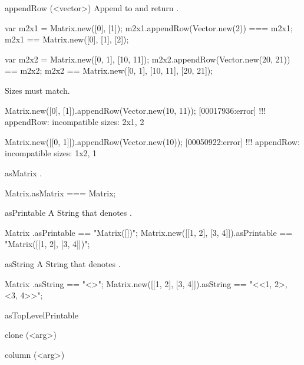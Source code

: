\begin{urbiscriptapi}
\item[appendRow](<vector>)%
  Append  to \this and return \this.
\begin{urbiassert}
var m2x1 = Matrix.new([0], [1]);
m2x1.appendRow(Vector.new(2)) === m2x1;
m2x1 == Matrix.new([0], [1], [2]);

var m2x2 = Matrix.new([0, 1], [10, 11]);
m2x2.appendRow(Vector.new(20, 21)) == m2x2;
m2x2 == Matrix.new([0, 1], [10, 11], [20, 21]);
\end{urbiassert}

  Sizes must match.
\begin{urbiscript}
Matrix.new([0], [1]).appendRow(Vector.new(10, 11));
[00017936:error] !!! appendRow: incompatible sizes: 2x1, 2

Matrix.new([[0, 1]]).appendRow(Vector.new(10));
[00050922:error] !!! appendRow: incompatible sizes: 1x2, 1
\end{urbiscript}


\item[asMatrix]%
  \this.
\begin{urbiassert}
Matrix.asMatrix === Matrix;
\end{urbiassert}

\item[asPrintable]%
  A String that denotes \this.
\begin{urbiassert}
Matrix                      .asPrintable == "Matrix([])";
Matrix.new([[1, 2], [3, 4]]).asPrintable == "Matrix([[1, 2], [3, 4]])";
\end{urbiassert}

\item[asString]%
  A String that denotes \this.
\begin{urbiassert}
Matrix                      .asString == "<>";
Matrix.new([[1, 2], [3, 4]]).asString == "<<1, 2>, <3, 4>>";
\end{urbiassert}

\item[asTopLevelPrintable]%
\begin{urbiassert}

\end{urbiassert}

\item[clone](<arg>)%
\begin{urbiassert}

\end{urbiassert}

\item[column](<arg>)%
\begin{urbiassert}


\end{urbiassert}
\end{urbiscriptapi}
